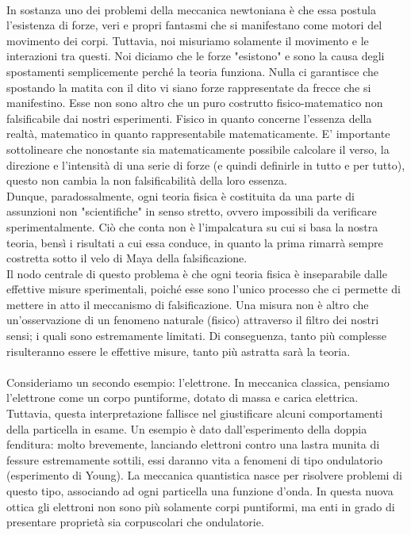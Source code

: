 \documentclass[]{article}
\begin{document}
	\\
	In sostanza uno dei problemi della meccanica newtoniana è che essa postula l'esistenza di forze, veri e propri fantasmi che si manifestano come motori del movimento dei corpi. Tuttavia, noi misuriamo solamente il movimento e le interazioni tra questi. Noi diciamo che le forze "esistono" e sono la causa degli spostamenti semplicemente perché la teoria funziona. Nulla ci garantisce che spostando la matita con il dito vi siano forze rappresentate da frecce che si manifestino. Esse non sono altro che un puro costrutto fisico-matematico non falsificabile dai nostri esperimenti. Fisico in quanto concerne l'essenza della realtà, matematico in quanto rappresentabile matematicamente. E' importante sottolineare che nonostante sia matematicamente possibile calcolare il verso, la direzione e l'intensità di una serie di forze (e quindi definirle in tutto e per tutto), questo non cambia la non falsificabilità della loro essenza.\\
	Dunque, paradossalmente, ogni teoria fisica è costituita da una parte di assunzioni non "scientifiche" in senso stretto, ovvero impossibili da verificare sperimentalmente. Ciò che conta non è l'impalcatura su cui si basa la nostra teoria, bensì i risultati a cui essa conduce, in quanto la prima rimarrà sempre costretta sotto il velo di Maya della falsificazione.\\
	Il nodo centrale di questo problema è che ogni teoria fisica è inseparabile dalle effettive misure sperimentali, poiché esse sono l'unico processo che ci permette di mettere in atto il meccanismo di falsificazione. Una misura non è altro che un'osservazione di un fenomeno naturale (fisico) attraverso il filtro dei nostri sensi; i quali sono estremamente limitati. Di conseguenza, tanto più complesse risulteranno essere le effettive misure, tanto più astratta sarà la teoria. \\
	\\
	Consideriamo un secondo esempio: l'elettrone. In meccanica classica, pensiamo l'elettrone come un corpo puntiforme, dotato di massa e carica elettrica. Tuttavia, questa interpretazione fallisce nel giustificare alcuni comportamenti della particella in esame. Un esempio è dato dall'esperimento della doppia fenditura: molto brevemente, lanciando elettroni contro una lastra munita di fessure estremamente sottili, essi daranno vita a fenomeni di tipo ondulatorio (esperimento di Young). La meccanica quantistica nasce per risolvere problemi di questo tipo, associando ad ogni particella una funzione d'onda. In questa nuova ottica gli elettroni non sono più solamente corpi puntiformi, ma enti in grado di presentare proprietà sia corpuscolari che ondulatorie.\\
\end{document}
